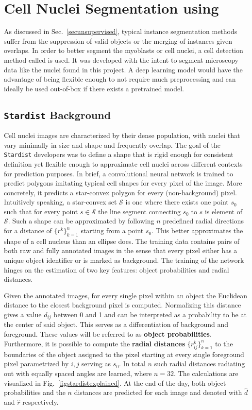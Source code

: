 \section{Cell Nuclei Segmentation using \stardist}\label{secstardist}
As discussed in Sec.~\ref{secunsupervised}, typical instance segmentation methods suffer from the suppression of valid objects or the merging of instances given overlaps. In order to better segment the myoblasts or cell nuclei, a cell detection method called \stardist \cite{schmidt2018, weigert2020} is used. It was developed with the intent to segment microscopy data like the nuclei found in this project. A deep learning model would have the advantage of being flexible enough to not require much preprocessing and can ideally be used out-of-box if there exists a pretrained model.
\subsection{\texttt{Stardist} Background}
Cell nuclei images are characterized by their dense population, with nuclei that vary minimally in size and shape and frequently overlap. The goal of the \texttt{Stardist} developers was to define a shape that is rigid enough for consistent definition yet flexible enough to approximate cell nuclei across different contexts for prediction purposes. In brief, a convolutional neural network is trained to predict polygons imitating typical cell shapes for every pixel of the image. More concretely, it predicts a star-convex polygon for every (non-background) pixel. Intuitively speaking, a star-convex set $\mathcal{S}$ is one where there exists one point $s_{0}$ such that for every point $s \in \mathcal{S}$ the line segment connecting $s_{0}$ to $s$ is element of $\mathcal{S}$. Such a shape can be approximated by following $n$ predefined radial directions for a distance of $\{r^{k}\}^{n}_{k = 1}$ starting from a point $s_{0}$. This better approximates the shape of a cell nucleus than an ellipse does. The training data contains pairs of both raw and fully annotated images in the sense that every pixel either has a unique object identifier or is marked as background. The training of the network hinges on the estimation of two key features: object probabilities and radial distances.

Given the annotated images, for every single pixel within an object the Euclidean distance to the closest background pixel is computed. Normalizing this distance gives a value $d_{ij}$ between 0 and 1 and can be interpreted as a probability to be at the center of said object. This serves as a differentiation of background and foreground. These values will be referred to as \textbf{object probabilities}. Furthermore, it is possible to compute the \textbf{radial distances} $\{r^{k}_{ij}\}^{n}_{k = 1}$ to the boundaries of the object assigned to the pixel  starting at every single foreground pixel parametrized by $i, j$ serving as $s_{0}$. In total $n$ such radial distances radiating out with equally spaced angles are learned, where $n = 32$. The calculations are visualized in Fig.~\ref{figstardistexplained}. At the end of the day, both object probabilities and the $n$ distances are predicted for each image and denoted with $\hat{d}$ and $\hat{r}$ respectively. 

